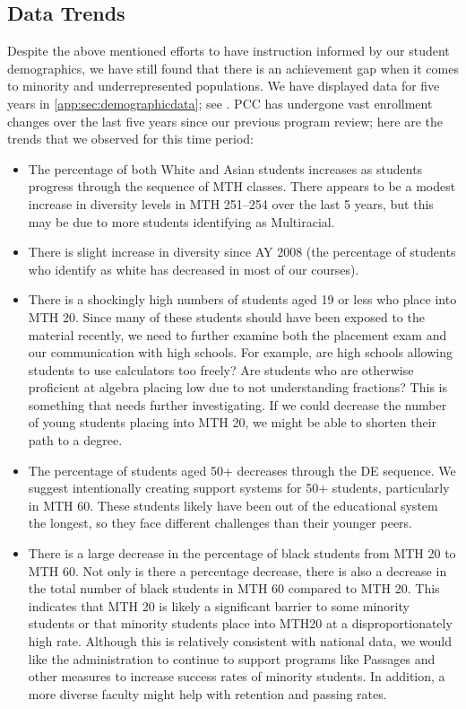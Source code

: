 \subsection{Data Trends}\label{needs:sec:trends}
Despite the above mentioned efforts to have instruction informed by our student demographics, we have still found that there is an achievement gap when it comes to minority and underrepresented populations. We have displayed data for five years in \vref{app:sec:demographicdata}; see . PCC has undergone vast enrollment changes over the last five years since our previous program review; here are the trends that we observed for this time period:
\begin{itemize}
	\item The percentage of both White and Asian students increases as students progress through the sequence of MTH classes. There appears to be a modest increase in diversity levels in MTH 251--254 over the last 5 years, but this may be due to more students identifying as Multiracial.
	\item There is slight increase in diversity since AY 2008 (the percentage of students who identify as white has decreased in most of our courses).  
	\item There is a shockingly high numbers of students aged 19 or less who place into MTH 20. Since many of these students should have been exposed to the material recently, we need to further examine both the placement exam and our communication with high schools. For example, are high schools allowing students to use calculators too freely? Are students who are otherwise proficient at algebra placing low due to not understanding fractions? This is something that needs further investigating. If we could decrease the number of young students placing into MTH 20, we might be able to shorten their path to a degree.
	\item The percentage of students aged 50+ decreases through the DE sequence. We suggest intentionally creating support systems for 50+ students, particularly in MTH 60. These students likely have been out of the educational system the longest, so they face different challenges than their younger peers.
	\item There is a large decrease in the percentage of black students from MTH 20 to MTH 60. Not only is there a percentage decrease, there is also a decrease in the total number of black students in MTH 60 compared to MTH 20. This indicates that MTH 20 is likely a significant barrier to some minority students or that minority students place into MTH20 at a disproportionately high rate. Although this is relatively consistent with national data, we would like the administration to continue to support programs like Passages and other measures to increase success rates of minority students. In addition, a more diverse faculty might help with retention and passing rates.

\end{itemize}
